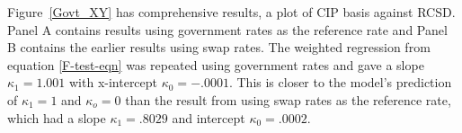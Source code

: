 

 





 


 

Figure~\ref{Govt_XY} has comprehensive results, a plot of CIP basis against RCSD.  Panel A contains results using government rates as the reference rate and Panel B contains the earlier results using swap rates.  The weighted regression from equation \eqref{F-test-eqn} was repeated using government rates and gave a slope $\kappa_1=1.001$ with x-intercept $\kappa_0=-.0001$.  This is closer to the model's prediction of $\kappa_1=1$ and $\kappa_o=0$ than the result from using swap rates as the reference rate, which had a slope $\kappa_1=.8029$ and intercept $\kappa_0=.0002$.

